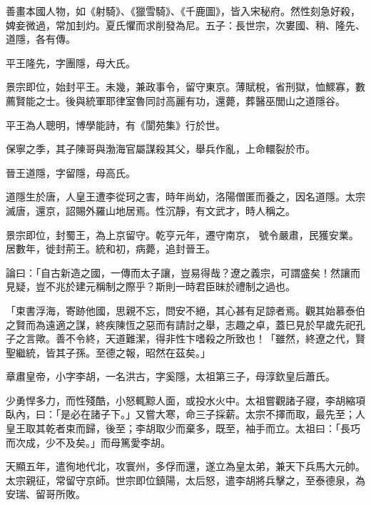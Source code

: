 \begin{pinyinscope}
 善畫本國人物，如《射騎》、《獵雪騎》、《千鹿圖》，皆入宋秘府。然性刻急好殺，婢妾微過，常加刲灼。夏氏懼而求削發為尼。五子：長世宗，次婁國、稍、隆先、道隱，各有傳。



 平王隆先，字團隱，母大氏。



 景宗即位，始封平王。未幾，兼政事令，留守東京。薄賦稅，省刑獄，恤鰥寡，數薦賢能之士。後與統軍耶律室魯同討高麗有功，還薨，葬醫巫閭山之道隱谷。



 平王為人聰明，博學能詩，有《閬苑集》行於世。



 保寧之季，其子陳哥與渤海官屬謀殺其父，舉兵作亂，上命轘裂於市。



 晉王道隱，字留隱，母高氏。



 道隱生於唐，人皇王遭李從珂之害，時年尚幼，洛陽僧匿而養之，因名道隱。太宗滅唐，還京，詔賜外羅山地居焉。性沉靜，有文武才，時人稱之。



 景宗即位，封蜀王，為上京留守。乾亨元年，遷守南京，
 號令嚴肅，民獲安業。居數年，徙封荊王。統和初，病薨，追封晉王。



 論曰：「自古新造之國，一傳而太子讓，豈易得哉？遼之義宗，可謂盛矣！然讓而見疑，豈不兆於建元稱制之際乎？斯則一時君臣昧於禮制之過也。



 「束書浮海，寄跡他國，思親不忘，問安不絕，其心甚有足諒者焉。觀其始慕泰伯之賢而為遠適之謀，終疾陳恆之惡而有請討之舉，志趣之卓，蓋巳見於早歲先祀孔子之言歟。善不令終，天道難潔，得非性卞嗜殺之所致也！「雖然，終遼之代，賢聖繼統，皆其子孫。至德之報，昭然在茲矣。」



 章肅皇帝，小字李胡，一名洪古，字奚隱，太祖第三子，母淳欽皇后蕭氏。



 少勇悍多力，而性殘酷，小怒輒黥人面，或投水火中。太祖嘗觀諸子寢，李胡縮項臥內，曰：「是必在諸子下。」又嘗大寒，命三子採薪。太宗不擇而取，最先至；人皇王取其乾者束而歸，後至；李胡取少而棄多，既至，袖手而立。太祖曰：「長巧而次成，少不及矣。」而母篤愛李胡。



 天顯五年，遣徇地代北，攻寰州，多俘而還，遂立為皇太弟，兼天下兵馬大元帥。太宗親征，常留守京師。世宗即位鎮陽，太后怒，遣李胡將兵擊之，至泰德泉，為安瑞、留哥所敗。




\end{pinyinscope}
